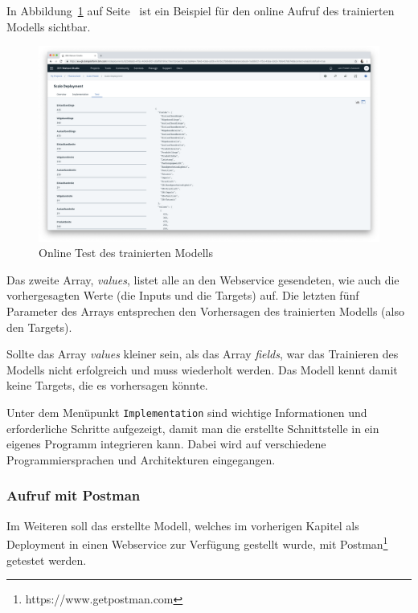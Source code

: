 In Abbildung~\ref{fig:umsetzung_deployment_test} auf Seite~\pageref{fig:umsetzung_deployment_test} ist ein Beispiel für
den online Aufruf des trainierten Modells sichtbar.

\begin{figure}[h]
    \centering
    \includegraphics[width=\textwidth]{images/kapitel_3/deployment_test.png}
    \caption{Online Test des trainierten Modells}
    \label{fig:umsetzung_deployment_test}
\end{figure}

Das zweite Array, \textit{values}, listet alle an den Webservice gesendeten, wie auch die vorhergesagten Werte (die
Inputs und die Targets) auf. Die letzten fünf Parameter des Arrays entsprechen den Vorhersagen des trainierten Modells
(also den Targets).

Sollte das Array \textit{values} kleiner sein, als das Array \textit{fields}, war das Trainieren des Modells nicht
erfolgreich und muss wiederholt werden. Das Modell kennt damit keine Targets, die es vorhersagen könnte.

Unter dem Menüpunkt \texttt{Implementation} sind wichtige Informationen und erforderliche Schritte aufgezeigt, damit
man die erstellte Schnittstelle in ein eigenes Programm integrieren kann. Dabei wird auf verschiedene Programmiersprachen
und Architekturen eingegangen.

\subsubsection{Aufruf mit Postman}
\label{subsec:Aufruf mit Postman}
Im Weiteren soll das erstellte Modell, welches im vorherigen Kapitel als Deployment in einen Webservice zur Verfügung
gestellt wurde, mit Postman\footnote{https://www.getpostman.com} getestet werden.


